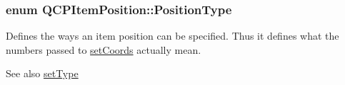 \subsubsection[{\texorpdfstring{Position\+Type}{PositionType}}]{\setlength{\rightskip}{0pt plus 5cm}enum {\bf Q\+C\+P\+Item\+Position\+::\+Position\+Type}}\hypertarget{classQCPItemPosition_aad9936c22bf43e3d358552f6e86dbdc8}{}\label{classQCPItemPosition_aad9936c22bf43e3d358552f6e86dbdc8}
Defines the ways an item position can be specified. Thus it defines what the numbers passed to \hyperlink{classQCPItemPosition_aa988ba4e87ab684c9021017dcaba945f}{set\+Coords} actually mean.

\begin{DoxySeeAlso}{See also}
\hyperlink{classQCPItemPosition_aa476abf71ed8fa4c537457ebb1a754ad}{set\+Type} 
\end{DoxySeeAlso}
